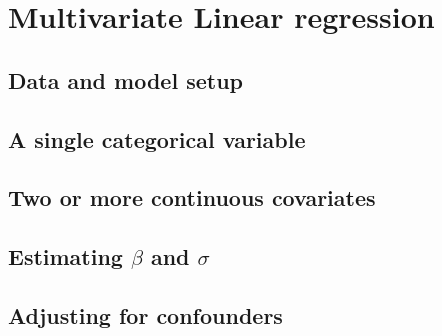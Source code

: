 \section{Multivariate Linear regression}

\subsection{Data and model setup}
\subsection{A single categorical variable}
\subsection{Two or more continuous covariates}
\subsection{Estimating $\beta$ and $\sigma$}
\subsection{Adjusting for confounders}




